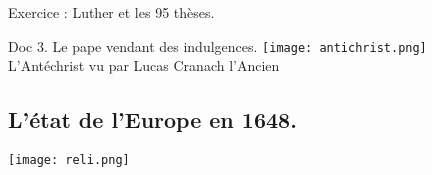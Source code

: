 \documentclass{beamer}
\begin{document}
\begin{frame}{Exercice : Luther et les 95 thèses.}
\begin{beamerboxesrounded}[scheme=blocimage]{Doc 3. Le pape vendant des indulgences.}
\texttt{[image: antichrist.png]} \\
\tiny L'Antéchrist vu par Lucas Cranach l'Ancien
\end{beamerboxesrounded}
\end{frame}

\subsection{L'état de l'Europe en 1648.}

\begin{frame}
\texttt{[image: reli.png]}
\end{frame}


  
\end{document}
